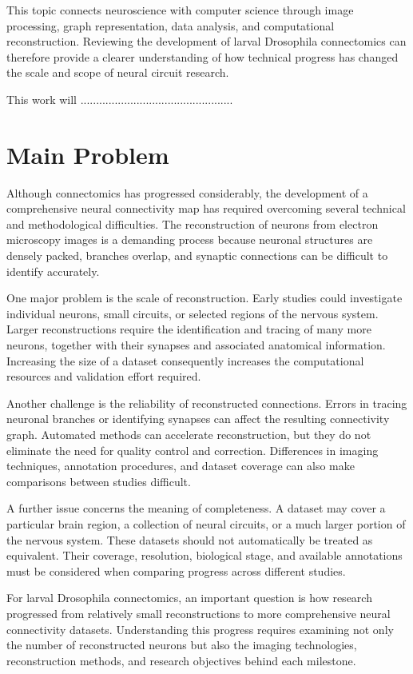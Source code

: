 \documentclass[conference]{IEEEtran}
\begin{document}
This topic connects neuroscience with computer science through image
processing, graph representation, data analysis, and computational
reconstruction. Reviewing the development of larval Drosophila
connectomics can therefore provide a clearer understanding of how
technical progress has changed the scale and scope of neural circuit
research.

This work will 
.................................................

\section{Main Problem}

Although connectomics has progressed considerably, the development
of a comprehensive neural connectivity map has required overcoming
several technical and methodological difficulties. The reconstruction
of neurons from electron microscopy images is a demanding process
because neuronal structures are densely packed, branches overlap,
and synaptic connections can be difficult to identify accurately.

One major problem is the scale of reconstruction. Early studies
could investigate individual neurons, small circuits, or selected
regions of the nervous system. Larger reconstructions require the
identification and tracing of many more neurons, together with their
synapses and associated anatomical information. Increasing the size
of a dataset consequently increases the computational resources and
validation effort required.

Another challenge is the reliability of reconstructed connections.
Errors in tracing neuronal branches or identifying synapses can affect
the resulting connectivity graph. Automated methods can accelerate
reconstruction, but they do not eliminate the need for quality control
and correction. Differences in imaging techniques, annotation
procedures, and dataset coverage can also make comparisons between
studies difficult.

A further issue concerns the meaning of completeness. A dataset may
cover a particular brain region, a collection of neural circuits, or
a much larger portion of the nervous system. These datasets should
not automatically be treated as equivalent. Their coverage, resolution,
biological stage, and available annotations must be considered when
comparing progress across different studies.

For larval Drosophila connectomics, an important question is how
research progressed from relatively small reconstructions to more
comprehensive neural connectivity datasets. Understanding this
progress requires examining not only the number of reconstructed
neurons but also the imaging technologies, reconstruction methods,
and research objectives behind each milestone.
\end{document}
